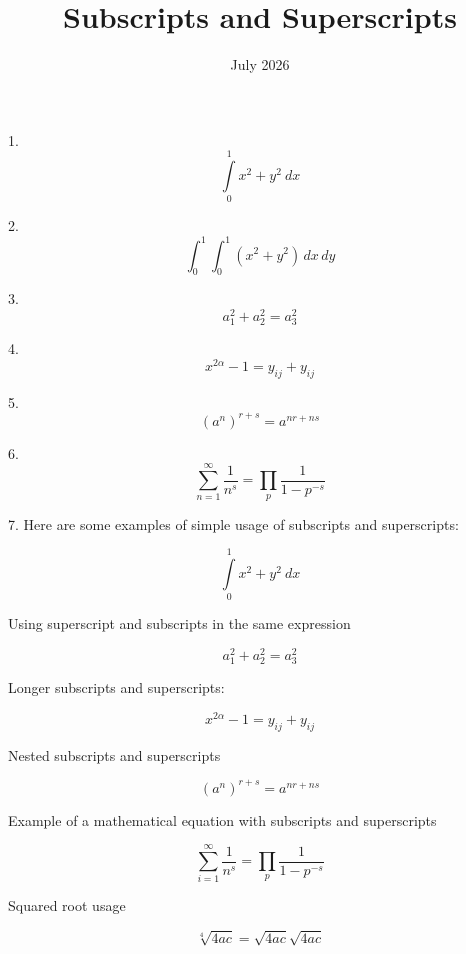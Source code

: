 \documentclass[12pt, letterpaper]{article}
\title{Subscripts and Superscripts }
\date{July 2026}
\begin{document}
	\maketitle

1. \[ \int\limits_0^1 x^2 + y^2 \ dx \]

2. \[
\int_0^1 \int_0^1 (x^2 + y^2) \, dx \, dy
\]

3. \[ 
a_1^2 + a_2^2 = a_3^2 \]

4.
\[ x^{2 \alpha} - 1 = y_{ij} + y_{ij}  \]

5. 
\[ (a^n)^{r+s} = a^{nr+ns}  \]

6. 
\[ \sum_{n=1}^{\infty} \frac{1}{n^s} 
= \prod_p \frac{1}{1 - p^{-s}} \]

7. 
Here are some examples of simple usage of subscripts and superscripts:

\[ \int\limits_0^1 x^2 + y^2 \ dx \]

\vspace{1cm}

Using superscript and subscripts in the same expression

\[ a_1^2 + a_2^2 = a_3^2 \]

\vspace{1cm}

Longer subscripts and superscripts:

\[ x^{2 \alpha} - 1 = y_{ij} + y_{ij}  \]

\vspace{1cm}

Nested subscripts and superscripts

\[ (a^n)^{r+s} = a^{nr+ns} \]

\vspace{1cm}

Example of a mathematical equation with subscripts and superscripts

\[ \sum_{i=1}^{\infty} \frac{1}{n^s} = \prod_p \frac{1}{1 - p^{-s}} \]

\vspace{1cm}

Squared root usage

\[ \sqrt[4]{4ac} = \sqrt{4ac}\sqrt{4ac} \]
\end{document}
